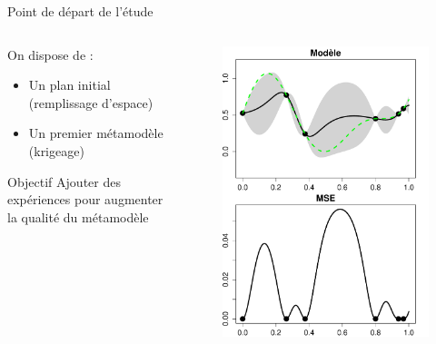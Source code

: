 \begin{frame}{Point de départ de l'étude}
\begin{columns}[t]
\begin{column}{7cm}
\begin{block}{On dispose de :}
\begin{itemize}
 \item Un plan initial (remplissage d'espace)
 \item Un premier métamodèle (krigeage)
\end{itemize}
\end{block}

\begin{exampleblock}{Objectif}
 Ajouter des expériences pour augmenter la qualité du métamodèle
\end{exampleblock}


\end{column}

\begin{column}{5cm}
\begin{figure}
	\centering
		\includegraphics[trim=0 110mm 0 0, clip, width=\textwidth]{autres/MSE.pdf}
\end{figure}
\end{column}
\end{columns}
\end{frame}
